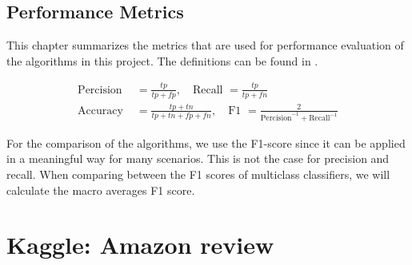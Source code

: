 \documentclass[11pt]{article}
\begin{document}
\subsection{Performance Metrics}

This chapter summarizes the metrics that are used for performance evaluation of the algorithms in this project. The definitions can be found in \cite{shalev2014}.

\begin{align}
\text{Percision } &= \frac{tp}{tp+fp}, \quad \text{Recall } = \frac{tp}{tp+fn}\\ 
\text{Accuracy } &= \frac{tp+tn}{tp+tn+fp+fn}, \quad \text{F1 } = \frac{2}{\text{Percision}^{-1}+ \text{Recall}^{-1}}
\end{align}

For the comparison of the algorithms, we use the F1-score since it can be applied in a meaningful way for many scenarios. This is not the case for precision and recall. When comparing between the F1 scores of multiclass classifiers, we will calculate the macro averages F1 score.

\section{Kaggle: Amazon review}
\end{document}

